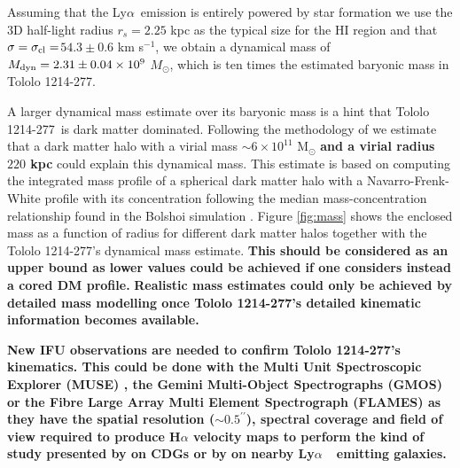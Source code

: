 \documentclass[a4paper,fleqn,usenatbib]{mnras}
\newcommand{\tol}{Tololo 1214-277}
\newcommand{\lya}{\ifmmode{{\rm Ly}\alpha}\else Ly$\alpha$\ \fi}
\newcommand{\sigmaclump}{$54.3\pm 0.6$ km s$^{-1}$}
\begin{document}
Assuming that the \lya emission is entirely powered by star formation 
we use the 3D half-light radius $r_s=2.25$ kpc as the typical size
for the HI region and that  $\sigma=\sigma_{\rm{cl}}=$\sigmaclump, we
obtain a dynamical mass of  $M_{\rm dyn}=2.31\pm0.04 \times 10^{9}$
$M_{\odot}$, which is ten times the estimated baryonic mass in
\tol. 

A larger dynamical mass estimate over its baryonic mass is a hint that
\tol\ is dark matter dominated.  
Following the methodology of \citet{2011ApJ...726..108T} we estimate
that a dark matter halo with a virial mass $\sim 6\times 10^{11}$
M$_{\odot}$ {\bf and a virial radius $220$ kpc } could explain this dynamical mass.
This estimate is based on computing the integrated mass profile of a
spherical dark matter halo with a Navarro-Frenk-White profile with its
concentration following the median mass-concentration
relationship found in the Bolshoi simulation
\citep{2012MNRAS.423.3018P,2016ApJ...832..169P}.  
Figure \ref{fig:mass} shows the enclosed mass as a function of radius
for different dark matter halos together with the \tol's dynamical
mass estimate. 
{\bf This should be considered as an upper bound as lower values
  could be achieved if one considers instead a cored DM profile.}
{\bf Realistic mass estimates could only be achieved by detailed mass
  modelling once \tol's detailed kinematic information becomes
  available.}  

{\bf New IFU observations are needed to confirm \tol's kinematics.
This could be done with the Multi Unit Spectroscopic Explorer (MUSE) 
\citep{2014Msngr.157...13B}, the Gemini Multi-Object Spectrographs (GMOS) 
\citep{2004PASP..116..425H} or the Fibre Large Array Multi Element
Spectrograph (FLAMES) \citep{2002Msngr.110....1P} as they have the spatial
resolution ($\sim0.5^{\prime\prime}$), spectral coverage and field
of view required to produce H$\alpha$ velocity maps to perform the
kind of study presented by \citet{2015A&A...577A..21C} on CDGs or by
\citet{Herenz16} on nearby \lya\ emitting galaxies.}  
\end{document}
